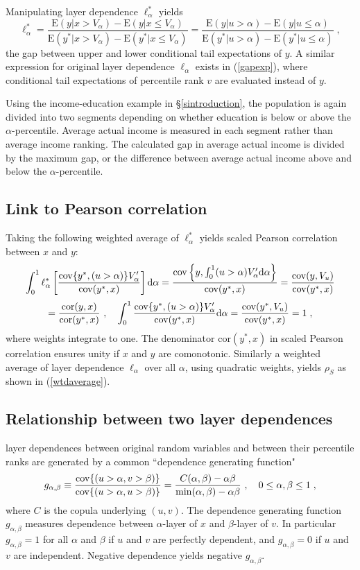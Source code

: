 \documentclass[authoryear]{elsarticle}
\newcommand{\cov}{{\rm cov}}
\newcommand{\E}{{\mathrm E}}
\newcommand{\cor}{\mathrm{cor}}
\newcommand{\de}{\mathrm{d}}
\newcommand{\cq}{\ ,\quad }
\newcommand{\eref}[1]{(\ref{#1})}
\newcommand{\sref}[1]{\S\ref{#1}}
\begin{document}
Manipulating layer dependence $\ell_\alpha^*$ yields
$$
\ell_\alpha^* = \frac{\E(y|x>V_\alpha)-\E(y|x\leq V_\alpha)}{\E(y^*|x>V_\alpha)-\E(y^*|x\leq V_\alpha)}
=\frac{\E(y|u>\alpha)-\E(y|u\leq\alpha)}{\E(y^*|u>\alpha)-\E(y^*|u\leq\alpha)} \;,
$$
the gap between upper and lower conditional tail expectations of $y$. A similar expression for original layer dependence $\ell_\alpha$ exists in \eref{gapexp}, where conditional tail expectations of percentile rank $v$ are evaluated instead of $y$.

Using the income-education example in \sref{sintroduction}, the population is again divided into two segments depending on whether education is below or above the $\alpha$-percentile. Average actual income is measured in each segment rather than average income ranking. The calculated gap in average actual income is divided by the maximum gap, or the difference between average actual income above and below the $\alpha$-percentile.


\subsection{Link to Pearson correlation}

Taking the following weighted average of $\ell_\alpha^*$ yields scaled Pearson correlation between $x$ and $y$:
$$
\int_0^1 \ell_\alpha^* \left[\frac{\cov\{y^*,(u>\alpha)\}V_\alpha'}{\cov(y^*,x)} \right] \de \alpha
= \frac{\cov\left\{y, \int_0^1 (u>\alpha)V_\alpha' \de \alpha \right\}}{\cov(y^*,x)} =\frac{\cov(y,V_u)}{\cov(y^*,x)}
$$
$$
= \frac{\cor(y,x)}{\cor(y^*,x)}
\cq \int_0^1 \frac{\cov\{y^*,(u>\alpha)\}V_\alpha'}{\cov(y^*,x)}  \de \alpha= \frac{\cov(y^*,V_u)}{\cov(y^*,x)} = 1 \;,
$$
where weights integrate to one. The denominator $\cor(y^*,x)$ in scaled Pearson correlation ensures unity if $x$ and $y$ are comonotonic. Similarly a weighted average of layer dependence $\ell_\alpha$ over all $\alpha$, using quadratic weights, yields  $\rho_S$ as shown in \eref{wtdaverage}.

\subsection{Relationship between two layer dependences}

layer dependences between original random variables and between their percentile ranks are generated by a common ``dependence generating function"
$$
g_{\alpha,\beta}\equiv \frac{\cov\{(u>\alpha,v>\beta)\}}{\cov\{(u>\alpha,u>\beta)\}}
= \frac{C(\alpha,\beta)-\alpha\beta}{\min(\alpha,\beta)-\alpha\beta}  \cq 0\leq \alpha,\beta\leq 1\;,
$$
where $C$ is the copula underlying $(u,v)$. The dependence generating function $g_{\alpha,\beta}$ measures dependence between $\alpha$-layer of $x$ and $\beta$-layer of $v$. In particular $g_{\alpha,\beta}=1$ for all $\alpha$ and $\beta$ if $u$ and $v$ are perfectly dependent, and $g_{\alpha,\beta}=0$ if $u$ and $v$ are independent. Negative dependence yields negative $g_{\alpha,\beta}$.
\end{document}
